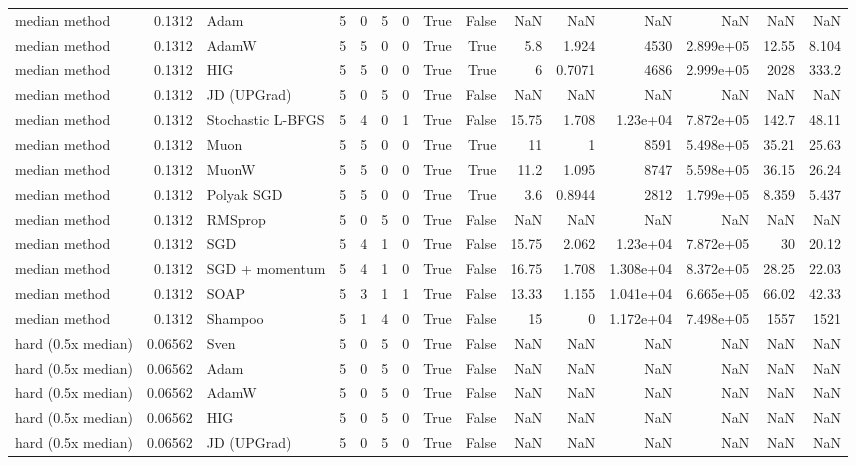 \begin{tabular}{lrlrrrrrrrrrrrr}
median method & 0.1312 & Adam & 5 & 0 & 5 & 0 & True & False & NaN & NaN & NaN & NaN & NaN & NaN \\
median method & 0.1312 & AdamW & 5 & 5 & 0 & 0 & True & True & 5.8 & 1.924 & 4530 & 2.899e+05 & 12.55 & 8.104 \\
median method & 0.1312 & HIG & 5 & 5 & 0 & 0 & True & True & 6 & 0.7071 & 4686 & 2.999e+05 & 2028 & 333.2 \\
median method & 0.1312 & JD (UPGrad) & 5 & 0 & 5 & 0 & True & False & NaN & NaN & NaN & NaN & NaN & NaN \\
median method & 0.1312 & Stochastic L-BFGS & 5 & 4 & 0 & 1 & True & False & 15.75 & 1.708 & 1.23e+04 & 7.872e+05 & 142.7 & 48.11 \\
median method & 0.1312 & Muon & 5 & 5 & 0 & 0 & True & True & 11 & 1 & 8591 & 5.498e+05 & 35.21 & 25.63 \\
median method & 0.1312 & MuonW & 5 & 5 & 0 & 0 & True & True & 11.2 & 1.095 & 8747 & 5.598e+05 & 36.15 & 26.24 \\
median method & 0.1312 & Polyak SGD & 5 & 5 & 0 & 0 & True & True & 3.6 & 0.8944 & 2812 & 1.799e+05 & 8.359 & 5.437 \\
median method & 0.1312 & RMSprop & 5 & 0 & 5 & 0 & True & False & NaN & NaN & NaN & NaN & NaN & NaN \\
median method & 0.1312 & SGD & 5 & 4 & 1 & 0 & True & False & 15.75 & 2.062 & 1.23e+04 & 7.872e+05 & 30 & 20.12 \\
median method & 0.1312 & SGD + momentum & 5 & 4 & 1 & 0 & True & False & 16.75 & 1.708 & 1.308e+04 & 8.372e+05 & 28.25 & 22.03 \\
median method & 0.1312 & SOAP & 5 & 3 & 1 & 1 & True & False & 13.33 & 1.155 & 1.041e+04 & 6.665e+05 & 66.02 & 42.33 \\
median method & 0.1312 & Shampoo & 5 & 1 & 4 & 0 & True & False & 15 & 0 & 1.172e+04 & 7.498e+05 & 1557 & 1521 \\
hard (0.5x median) & 0.06562 & Sven & 5 & 0 & 5 & 0 & True & False & NaN & NaN & NaN & NaN & NaN & NaN \\
hard (0.5x median) & 0.06562 & Adam & 5 & 0 & 5 & 0 & True & False & NaN & NaN & NaN & NaN & NaN & NaN \\
hard (0.5x median) & 0.06562 & AdamW & 5 & 0 & 5 & 0 & True & False & NaN & NaN & NaN & NaN & NaN & NaN \\
hard (0.5x median) & 0.06562 & HIG & 5 & 0 & 5 & 0 & True & False & NaN & NaN & NaN & NaN & NaN & NaN \\
hard (0.5x median) & 0.06562 & JD (UPGrad) & 5 & 0 & 5 & 0 & True & False & NaN & NaN & NaN & NaN & NaN & NaN \\

\end{tabular}
